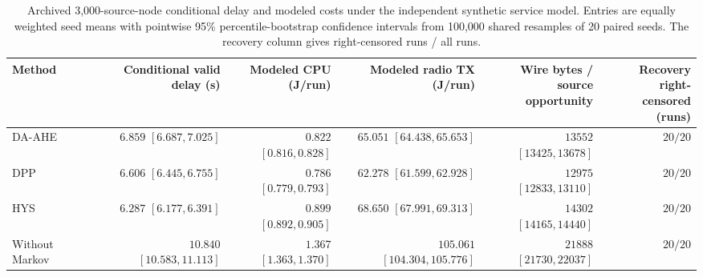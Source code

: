 \begin{table}[tbh]
\centering
\small
\caption{Archived 3,000-source-node conditional delay and modeled costs under the independent synthetic service model. Entries are equally weighted seed means with pointwise 95\% percentile-bootstrap confidence intervals from 100,000 shared resamples of 20 paired seeds. The recovery column gives right-censored runs / all runs.}
\label{tab:performance_costs}
\begin{tabular}{lrrrrr}
\hline
Method & \shortstack{Conditional valid\\delay (s)} & \shortstack{Modeled CPU\\(J/run)} & \shortstack{Modeled radio TX\\(J/run)} & \shortstack{Wire bytes /\\source opportunity} & \shortstack{Recovery right-\\censored (runs)}\\
\hline
DA-AHE & \shortstack{$6.859$\\$[6.687, 7.025]$} & \shortstack{$0.822$\\$[0.816, 0.828]$} & \shortstack{$65.051$\\$[64.438, 65.653]$} & \shortstack{$13552$\\$[13425, 13678]$} & $20/20$\\
DPP & \shortstack{$6.606$\\$[6.445, 6.755]$} & \shortstack{$0.786$\\$[0.779, 0.793]$} & \shortstack{$62.278$\\$[61.599, 62.928]$} & \shortstack{$12975$\\$[12833, 13110]$} & $20/20$\\
HYS & \shortstack{$6.287$\\$[6.177, 6.391]$} & \shortstack{$0.899$\\$[0.892, 0.905]$} & \shortstack{$68.650$\\$[67.991, 69.313]$} & \shortstack{$14302$\\$[14165, 14440]$} & $20/20$\\
Without Markov & \shortstack{$10.840$\\$[10.583, 11.113]$} & \shortstack{$1.367$\\$[1.363, 1.370]$} & \shortstack{$105.061$\\$[104.304, 105.776]$} & \shortstack{$21888$\\$[21730, 22037]$} & $20/20$\\

\end{tabular}
\end{table}
